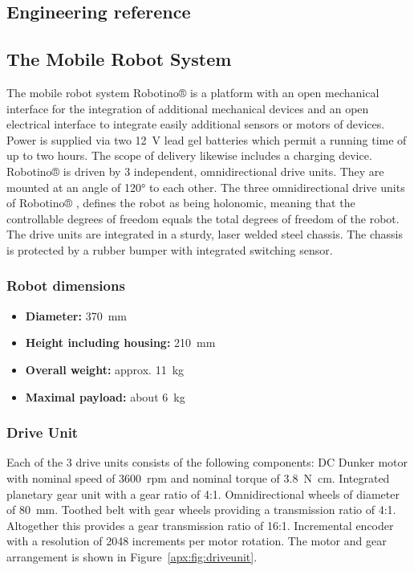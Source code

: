 \documentclass[12pt,twoside]{article}
\begin{document}
\begin{appendix}
\newpage

\section{Engineering reference} \label{apx:sec:engref}
\subsection{The Mobile Robot System}
The mobile robot system Robotino® is a platform with an open
mechanical interface for the integration of additional mechanical
devices and an open electrical interface to integrate easily
additional sensors or motors of devices. Power is supplied via two
\SI{12}{\volt} lead gel batteries which permit a running time of up to
two hours.  The scope of delivery likewise includes a charging
device. Robotino® is driven by 3 independent, omnidirectional drive
units. They are mounted at an angle of \ang{120} to each other. The
three omnidirectional drive units of Robotino® , defines the robot as
being holonomic, meaning that the controllable degrees of freedom
equals the total degrees of freedom of the robot. The drive units are
integrated in a sturdy, laser welded steel chassis. The chassis is
protected by a rubber bumper with integrated switching sensor.

\subsubsection{Robot dimensions}
\begin{itemize}
	\item[] \textbf{Diameter:} \SI{370}{\milli\metre}
	\item[] \textbf{Height including housing:} \SI{210}{\milli\metre}
 	\item[] \textbf{Overall weight:} approx. \SI{11}{\kilogram}
 	\item[] \textbf{Maximal payload:} about \SI{6}{\kilogram}
 \end{itemize}

\subsubsection{Drive Unit}
Each of the 3 drive units consists of the following components: DC
Dunker motor with nominal speed of \SI{3600}{rpm} and nominal torque
of \SI{3.8}{\newton\centi\metre}. Integrated planetary gear unit with
a gear ratio of 4:1. Omnidirectional wheels of diameter of
\SI{80}{\milli\metre}. Toothed belt with gear wheels providing a
transmission ratio of 4:1.
%
Altogether this provides a gear transmission ratio of
16:1. Incremental encoder with a resolution of 2048 increments per
motor rotation.
%
The motor and gear arrangement is shown in
Figure~\ref{apx:fig:driveunit}.


\end{appendix}
\end{document}
